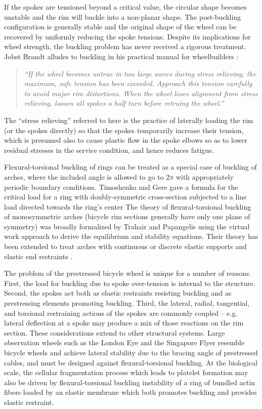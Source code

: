 \documentclass[\rootdir/thesis.tex]{subfiles}
\begin{document}
If the spokes are tensioned beyond a critical value, the circular shape becomes unstable and the rim will buckle into a non-planar shape. The post-buckling configuration is generally stable and the original shape of the wheel can be recovered by uniformly reducing the spoke tensions. Despite its implications for wheel strength, the buckling problem has never received a rigorous treatment. Jobst Brandt alludes to buckling in his practical manual for wheelbuilders \cite{Brandt1993}:

\begin{quote}
\emph{``If the wheel becomes untrue in two large waves during stress relieving, the maximum, safe tension has been exceeded. Approach this tension carefully to avoid major rim distortions. When the wheel loses alignment from stress relieving, loosen all spokes a half turn before retruing the wheel.''}
\end{quote}

The ``stress relieving'' referred to here is the practice of laterally loading the rim (or the spokes directly) so that the spokes temporarily increase their tension, which is presumed also to cause plastic flow in the spoke elbows so as to lower residual stresses in the service condition, and hence reduces fatigue.

Flexural-torsional buckling of rings can be treated as a special case of buckling of arches, where the included angle is allowed to go to $2\pi$ with appropriately periodic boundary conditions. Timoshenko and Gere \cite{Timoshenko1961} gave a formula for the critical load for a ring with doubly-symmetric cross-section subjected to a line load directed towards the ring's center The theory of flexural-torsional buckling of monosymmetric arches (bicycle rim sections generally have only one plane of symmetry) was broadly formalized by Trahair and Papangelis \cite{Trahair1987} using the virtual work approach to derive the equilibrium and stability equations. Their theory has been extended to treat arches with continuous \cite{Pi2002} or discrete \cite{Bradford2002} elastic supports and elastic end restraints \cite{Guo2014}.

The problem of the prestressed bicycle wheel is unique for a number of reasons. First, the load for buckling due to spoke over-tension is internal to the structure. Second, the spokes act both as elastic restraints resisting buckling and as prestressing elements promoting buckling. Third, the lateral, radial, tangential, and torsional restraining actions of the spokes are commonly coupled – e.g. lateral deflection at a spoke may produce a mix of those reactions on the rim section. These considerations extend to other structural systems. Large observation wheels such as the London Eye\cite{Mann2001} and the Singapore Flyer\cite{Allsop2009} resemble bicycle wheels and achieve lateral stability due to the bracing angle of prestressed cables, and must be designed against flexural-torsional buckling. At the biological scale, the cellular fragmentation process which leads to platelet formation may also be driven by flexural-torsional buckling instability of a ring of bundled actin fibers loaded by an elastic membrane which both promotes buckling and provides elastic restraint\cite{Stroberg2016}.
\end{document}
